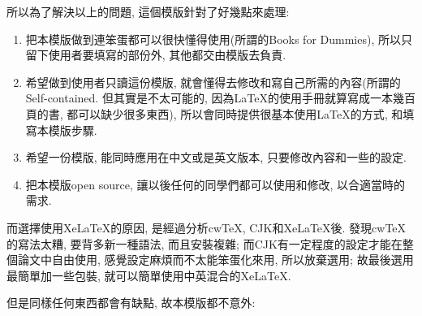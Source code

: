 
{}
所以為了解決以上的問題, 這個模版針對了好幾點來處理:

\begin{enumerate}

  \item
  {
    把本模版做到連笨蛋都可以很快懂得使用(所謂的Books for Dummies), 所以只留下使用者要填寫的部份外, 其他都交由模版去負責.
  } %

  \item
  {
    希望做到使用者只讀這份模版, 就會懂得去修改和寫自己所需的內容(所謂的Self-contained. 但其實是不太可能的, 因為LaTeX的使用手冊就算寫成一本幾百頁的書, 都可以缺少很多東西), 所以會同時提供很基本使用LaTeX的方式, 和填寫本模版步驟.
  } %

  \item
  {
    希望一份模版, 能同時應用在中文或是英文版本, 只要修改內容和一些的設定.
  } %

  \item
  {
    把本模版open source, 讓以後任何的同學們都可以使用和修改, 以合適當時的需求.
  } %

\end{enumerate}

而選擇使用XeLaTeX的原因, 是經過分析cwTeX, CJK和XeLaTeX後. 發現cwTeX的寫法太糟, 要背多新一種語法, 而且安裝複雜; 而CJK有一定程度的設定才能在整個論文中自由使用, 感覺設定麻煩而不太能笨蛋化來用, 所以放棄選用; 故最後選用最簡單加一些包裝, 就可以簡單使用中英混合的XeLaTeX.


但是同樣任何東西都會有缺點, 故本模版都不意外:

